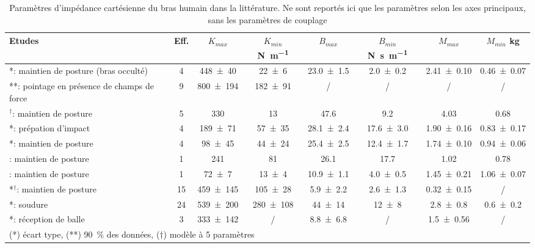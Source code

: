 \begin{table}
	\centering
	\caption[Paramètres d'impédance cartésienne du bras humain estimés dans la littérature]{%
	Paramètres d'impédance cartésienne du bras humain dans la littérature. Ne sont reportés ici que les paramètres selon les axes principaux, sans les paramètres de couplage}
	\label{tab_impedance_litterature}
	\begin{tabular}{| p{50mm} | c || c  c | c  c | c  c |} 
		\hline
		Etudes & Eff. & $K_{max}$ & $K_{min}$ \si{\newton\per\metre} & $B_{max}$ & $B_{min}$ \si{\newton\second\per\metre} & $M_{max}$ & $M_{min}$ \si{\kilogram} \\ \hline
		\parencite{tsuji_human_1995}*: maintien de posture (bras occulté) & 4 & \SI{448\pm40}{}& \SI{22\pm6}{} & \SI{23.0\pm1.5}{} & \SI{2.0\pm0.2}{} & \SI{2.41\pm0.10}{} & \SI{0.46\pm0.07}{} \\ \hline
		\parencite{burdet_central_2001}**: pointage en présence de champs de force & 9 & \SI{800\pm194}{}  & \SI{182\pm91}{} & / & / & / & / \\ \hline
		\parencite{speich_modeling_2005}$^\dagger$: maintien de posture & 5 & \SI{330}{}  & \SI{13}{} & \SI{47.6}{} & \SI{9.2}{} & \SI{4.03}{} & \SI{0.68}{} \\ \hline
		\parencite{tsuji_bio-mimetic_2008}*: prépation d'impact & 4 & \SI{189\pm71}{}  & \SI{57\pm35}{} & \SI{28.1\pm2.4}{} & \SI{17.6\pm3.0}{} & \SI{1.90\pm0.16}{} & \SI{0.83\pm0.17}{} \\
		\parencite{tsuji_bio-mimetic_2008}*: maintien de posture & 4 & \SI{98\pm45}{}  & \SI{44\pm24}{} & \SI{25.4\pm2.5}{} & \SI{12.4\pm1.7}{} & \SI{1.74\pm0.10}{} & \SI{0.94\pm0.06}{} \\ \hline
		\parencite{ajoudani_tele-impedance_2012}: maintien de posture & 1 & \SI{241}{}  & \SI{81}{} & \SI{26.1}{} & \SI{17.7}{} & \SI{1.02}{} & \SI{0.78}{} \\ \hline
		\parencite{dyck_measuring_2013}: maintien de posture & 1 & \SI{72\pm7}{}  & \SI{13\pm4}{} & \SI{10.9\pm1.1}{} & \SI{4.0\pm0.5}{} & \SI{1.45\pm0.21}{} & \SI{1.06\pm0.07}{} \\ \hline
		\parencite{fu_human-arm-and-hand-dynamic_2012}*$^\dagger$: maintien de posture & 15 & \SI{459\pm145}{}  & \SI{105\pm28}{} & \SI{5.9\pm2.2}{} & \SI{2.6\pm1.3}{} & \SI{0.32\pm0.15}{} & / \\ \hline
		\parencite{erden_hand_2015}*: soudure & 24 & \SI{539\pm200}{}  & \SI{280\pm108}{} & \SI{44\pm14}{} & \SI{12\pm8}{} & \SI{2.8\pm0.8}{} & \SI{0.6\pm0.2}{} \\ \hline
		\parencite{lee_simple_2017}*: réception de balle & 3 & \SI{333\pm142}{}  & / & \SI{8.8\pm6.8}{} & / & \SI{1.5\pm0.56}{} & / \\ \hline
		\multicolumn{8}{l}{(*) écart type, (**) \SI{90}{\percent} des données, ($\dagger$) modèle à 5 paramètres}
	\end{tabular}
\end{table}

